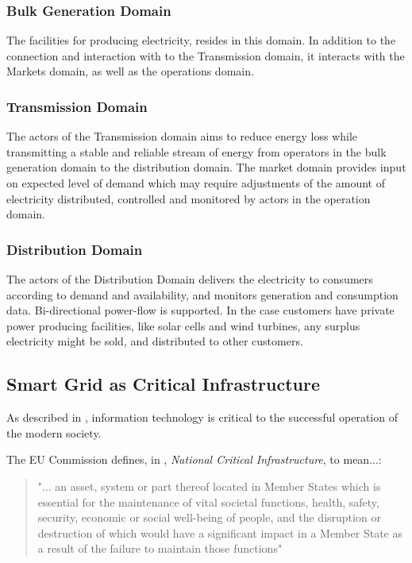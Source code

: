     \subsubsection{Bulk Generation Domain} The facilities for producing electricity, resides in this domain. In addition to the connection and interaction with  to the Transmission domain, it interacts with the Markets domain, as well as the operations domain.  
    \subsubsection{Transmission Domain} The actors of the Transmission domain aims to reduce energy loss while transmitting a stable and reliable stream of energy from operators in the bulk generation domain to the distribution domain. The market domain provides input on expected level of demand which may require adjustments of the amount of electricity distributed, controlled and monitored by actors in the operation domain.  
    \subsubsection{Distribution Domain} The actors of the Distribution Domain delivers the electricity to consumers according to demand and availability, and monitors generation and consumption data. Bi-directional power-flow is supported. In the case customers have private  power producing facilities, like solar cells and wind turbines, any surplus electricity might be sold, and distributed to other customers.\\ 

\subsection{Smart Grid as Critical Infrastructure}



As described in \cite{colesniuc2013cyberspace}, information technology is critical to the successful operation of the modern society.




 
 The EU Commission defines, in \cite{eu2008council}, \textit{National Critical Infrastructure}, to mean...:
 
 \begin{quote}
    "... an asset, system or part thereof
located in Member States which is essential for the maintenance of vital societal functions, health, safety, security,
economic or social well-being of people, and the disruption
or destruction of which would have a significant impact in a
Member State as a result of the failure to maintain those
functions"   \cite[p.  L 345/77]{eu2008council}  
 \end{quote}
 
